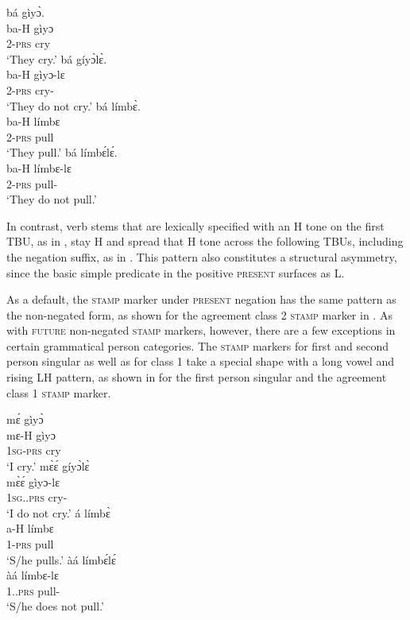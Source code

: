 \ea\label{le}
\ea  \label{lea} \glll  bá gìyɔ̀. \\
          ba-H gìyɔ \\
           2-\textsc{prs} cry\\
    \trans `They cry.'
\ex \label{leb} 
\glll  bá gíyɔ̀lɛ̀. \\
          ba-H gìyɔ-lɛ \\
           2-\textsc{prs} cry-{\NEG}   \\
    \trans `They do not cry.'
\ex \label{lec} \glll  bá límbɛ̀. \\
          ba-H límbɛ \\
           2-\textsc{prs} pull\\
    \trans `They pull.'
\ex  \label{led}
\glll  bá límbɛ́lɛ́. \\
          ba-H límbɛ-lɛ \\
           2-\textsc{prs} pull-{\NEG}   \\
    \trans `They do not pull.'
\z
\z

In contrast, verb stems that are lexically specified with an H tone on the first TBU, as in , stay H and spread that H tone across the following TBUs, including the negation suffix, as in . This pattern also constitutes a structural asymmetry, since the basic simple predicate in the positive \textsc{present} surfaces as L.
 



As a default, the \textsc{stamp} marker under \textsc{present} negation has the same pattern as the non-negated form, as shown for the agreement class 2 \textsc{stamp} marker in . As with \textsc{future} non-negated \textsc{stamp} markers, however, there are a few exceptions in certain grammatical person categories. The \textsc{stamp} markers for first and second person singular as well as for class 1 take a special shape with a long vowel and rising LH pattern, as shown in  for the first person singular and the agreement class 1 \textsc{stamp} marker.

\ea\label{le1}
\ea  \label{le1a} \glll  mɛ́ gìyɔ̀ \\
          mɛ-H gìyɔ \\
           1\textsc{sg}-\textsc{prs} cry\\
    \trans `I cry.'
\ex \label{le1b} 
\glll  mɛ̀ɛ́ gíyɔ̀lɛ̀\\
          mɛ̀ɛ́ gìyɔ-lɛ \\
           1\textsc{sg}.{\NEG}.\textsc{prs} cry-{\NEG}   \\
    \trans `I do not cry.'
\ex \label{le1c} \glll  á límbɛ̀\\
          a-H límbɛ \\
           1-\textsc{prs} pull\\
    \trans `S/he pulls.'
\ex  \label{le1d}
\glll  àá límbɛ́lɛ́\\
          àá límbɛ-lɛ \\
           1.{\NEG}.\textsc{prs} pull-{\NEG}   \\
    \trans `S/he does not pull.'
\z
\z

